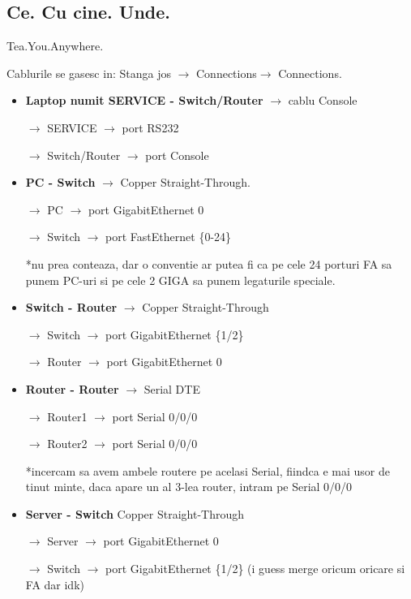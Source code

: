 \documentclass{article}
\begin{document}
\subsection{Ce. Cu cine. Unde.}
Tea.You.Anywhere.

Cablurile se gasesc in:
Stanga jos $\rightarrow$ Connections$\rightarrow$ Connections. 

\begin{itemize}
    \item \textbf{Laptop numit SERVICE - Switch/Router} $\rightarrow$ cablu Console 

    $\rightarrow$ SERVICE $\rightarrow$ port RS232

    $\rightarrow$ Switch/Router $\rightarrow$ port Console

    \item \textbf{PC - Switch}  $\rightarrow$ Copper Straight-Through. 

    $\rightarrow$ PC $\rightarrow$ port GigabitEthernet 0
    
    $\rightarrow$ Switch $\rightarrow$ port FastEthernet \{0-24\}

    *nu prea conteaza, dar o conventie ar putea fi ca pe cele 24 porturi FA sa punem PC-uri si pe cele 2 GIGA sa punem legaturile speciale.

    \item \textbf{Switch - Router} $\rightarrow$ Copper Straight-Through
    
    $\rightarrow$ Switch $\rightarrow$ port GigabitEthernet \{1/2\}
    
    $\rightarrow$ Router $\rightarrow$ port GigabitEthernet 0
    \item \textbf{Router - Router} $\rightarrow$ Serial DTE
    
    $\rightarrow$ Router1 $\rightarrow$ port Serial 0/0/0
    
    $\rightarrow$ Router2 $\rightarrow$ port Serial 0/0/0
     
    *incercam sa avem ambele routere pe acelasi Serial, fiindca e mai usor de tinut minte, daca apare un al 3-lea router, intram pe Serial 0/0/0

    \item \textbf{Server - Switch} Copper Straight-Through

    $\rightarrow$ Server $\rightarrow$ port GigabitEthernet 0

    $\rightarrow$ Switch $\rightarrow$ port GigabitEthernet \{1/2\} (i guess merge oricum oricare si FA dar idk)
    

\end{itemize}
\end{document}
